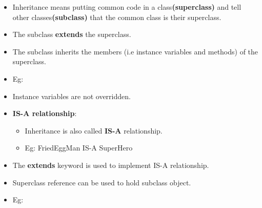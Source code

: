 \setlength{\columnsep}{3pt}
\begin{flushleft}

\begin{itemize}
	\item Inheritance means putting common code in a class\textbf{(superclass)} and tell other classes\textbf{(subclass)} that the common class is their superclass. 
	\item The subclass \textbf{extends} the superclass.
	\item The subclass inherits the members (i.e instance variables and methods) of the superclass.
	\item Eg:

	\newpage	
	\item Instance variables are not overridden.
	\bigskip
	\item \textbf{IS-A relationship}: 
	\begin{itemize}
		\item Inheritance is also called \textbf{IS-A} relationship.
		\item Eg: FriedEggMan IS-A SuperHero
	\end{itemize}
	\bigskip
	\item The \textbf{extends} keyword is used to implement IS-A relationship.
	\bigskip

	\item Superclass reference can be used to hold subclass object. 	
	\item Eg:
	

\end{itemize}
\end{flushleft}

